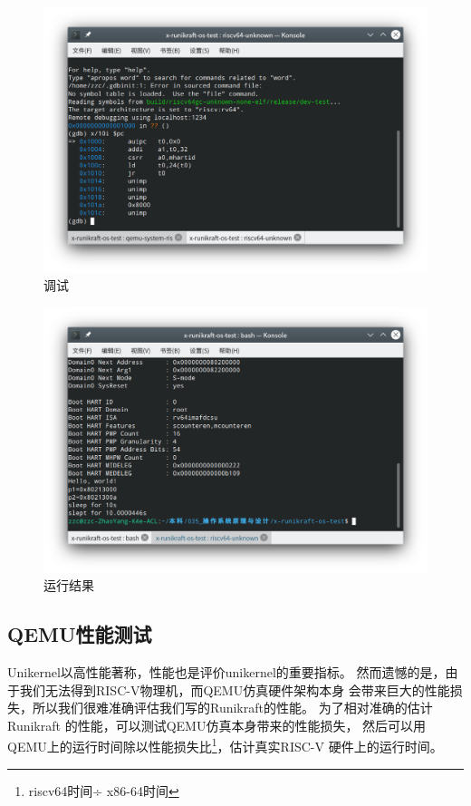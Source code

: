 \documentclass{../runikraft-report}
\begin{document}
\begin{figure}[tbh!]
\centering
\includegraphics[width=0.9\linewidth]{assets/debug}
\caption{调试}
\label{fig:debug}
\end{figure}

\begin{figure}[tbh!]
\centering
\includegraphics[width=0.9\linewidth]{assets/run}
\caption{运行结果}
\label{fig:run}
\end{figure}

\subsection{QEMU性能测试}
Unikernel以高性能著称，性能也是评价unikernel的重要指标。
然而遗憾的是，由于我们无法得到RISC-V物理机，而QEMU仿真硬件架构本身
会带来巨大的性能损失，所以我们很难准确评估我们写的Runikraft的性能。
为了相对准确的估计Runikraft
的性能，可以测试QEMU仿真本身带来的性能损失，
然后可以用QEMU上的运行时间除以性能损失比\footnote{riscv64时间÷ x86-64时间}，估计真实RISC-V
硬件上的运行时间。
\end{document}

